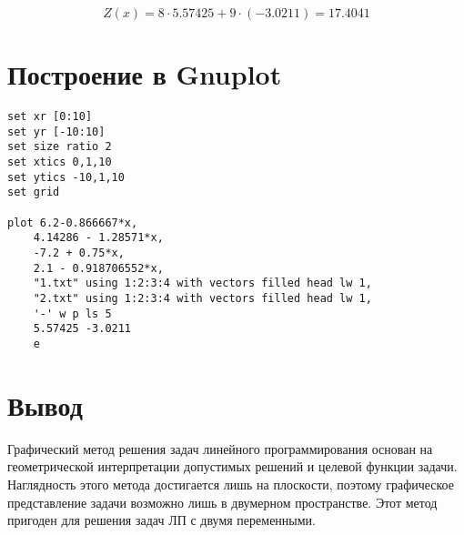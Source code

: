 \documentclass[14pt]{extarticle}
\begin{document}
\[Z(x) = 8\cdot5.57425 + 9\cdot(-3.0211) = 17.4041\]



\newpage
\section{Построение в Gnuplot}

\begin{lstlisting}
set xr [0:10]
set yr [-10:10]
set size ratio 2 
set xtics 0,1,10
set ytics -10,1,10
set grid

plot 6.2-0.866667*x,
    4.14286 - 1.28571*x,
    -7.2 + 0.75*x,
    2.1 - 0.918706552*x,
    "1.txt" using 1:2:3:4 with vectors filled head lw 1,
    "2.txt" using 1:2:3:4 with vectors filled head lw 1,
    '-' w p ls 5 
    5.57425 -3.0211
    e
\end{lstlisting}

\section{Вывод}
Графический метод решения задач линейного программирования основан на геометрической интерпретации допустимых решений и целевой функции задачи. Наглядность этого метода достигается лишь на плоскости, поэтому графическое представление задачи возможно лишь в двумерном пространстве. Этот метод пригоден для решения задач ЛП с двумя переменными.
\end{document}
